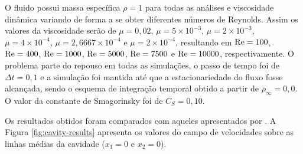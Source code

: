 O fluido possui massa específica $\rho=1$ para todas as análises e viscosidade dinâmica variando de forma a se obter diferentes números de Reynolds. Assim os valores da viscosidade serão de $\mu=0,02$, $\mu=5\times10^{-3}$, $\mu=2\times10^{-3}$, $\mu=4\times10^{-4}$, $\mu=2,6667\times10^{-4}$ e $\mu=2\times10^{-4}$, resultando em $\mathrm{Re}=100$, $\mathrm{Re}=400$, $\mathrm{Re}=1000$, $\mathrm{Re}=5000$, $\mathrm{Re}=7500$ e $\mathrm{Re}=10000$, respectivamente. O problema parte do repouso em todas as simulações, o passo de tempo foi de $\Delta t=0,1$ e a simulação foi mantida até que a estacionariedade do fluxo fosse alcançada, sendo o esquema de integração temporal obtido a partir de $\rho_\infty=0,0$. O valor da constante de Smagorinsky foi de $C_S=0,10$.

Os resultados obtidos foram comparados com aqueles apresentados por . A Figura \ref{fig:cavity-results} apresenta os valores do campo de velocidades sobre as linhas médias da cavidade ($x_1=0$ e $x_2=0$).

